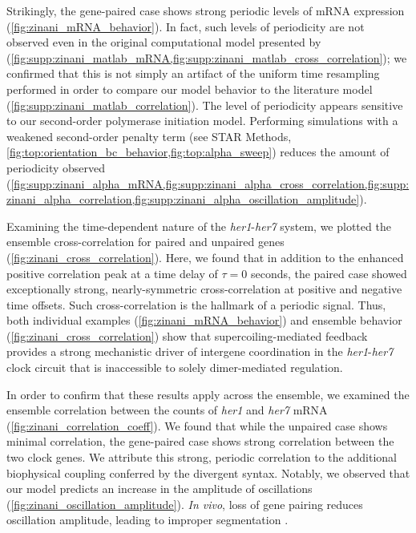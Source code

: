 \documentclass[11pt]{article} %
\begin{document}
Strikingly, the gene-paired case shows strong periodic levels of mRNA expression (\cref{fig:zinani_mRNA_behavior}). In fact, such levels of periodicity are not observed even in the original computational model presented by \textcite{zinaniPairingSegmentationClock2021} (\cref{fig:supp:zinani_matlab_mRNA,fig:supp:zinani_matlab_cross_correlation}); we confirmed that this is not simply an artifact of the uniform time resampling performed in order to compare our model behavior to the literature model (\cref{fig:supp:zinani_matlab_correlation}). The level of periodicity appears sensitive to our second-order polymerase initiation model. Performing simulations with a weakened second-order penalty term (see STAR Methods, \cref{fig:top:orientation_bc_behavior,fig:top:alpha_sweep}) reduces the amount of periodicity observed (\cref{fig:supp:zinani_alpha_mRNA,fig:supp:zinani_alpha_cross_correlation,fig:supp:zinani_alpha_correlation,fig:supp:zinani_alpha_oscillation_amplitude}). 

Examining the time-dependent nature of the \textit{her1}-\textit{her7} system, we plotted the ensemble cross-correlation for paired and unpaired genes (\cref{fig:zinani_cross_correlation}). Here, we found that in addition to the enhanced positive correlation peak at a time delay of \(\tau = 0\) seconds, the paired case showed exceptionally strong, nearly-symmetric cross-correlation at positive and negative time offsets. Such cross-correlation is the hallmark of a periodic signal. Thus, both individual examples (\cref{fig:zinani_mRNA_behavior}) and ensemble behavior (\cref{fig:zinani_cross_correlation}) show that supercoiling-mediated feedback provides a strong mechanistic driver of intergene coordination in the \textit{her1}-\textit{her7} clock circuit that is inaccessible to solely dimer-mediated regulation.

In order to confirm that these results apply across the ensemble, we examined the ensemble correlation between the counts of \textit{her1} and \textit{her7} mRNA (\cref{fig:zinani_correlation_coeff}). We found that while the unpaired case shows minimal correlation, the gene-paired case shows strong correlation between the two clock genes. We attribute this strong, periodic correlation to the additional biophysical coupling conferred by the divergent syntax. Notably, we observed that our model predicts an increase in the amplitude of oscillations (\cref{fig:zinani_oscillation_amplitude}). \textit{In vivo}, loss of gene pairing reduces oscillation amplitude, leading to improper segmentation \parencite{zinaniPairingSegmentationClock2021}. 
\end{document}
